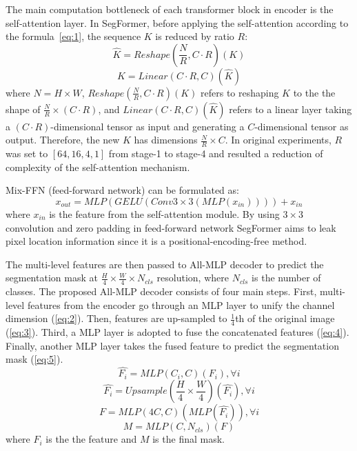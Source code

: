 The main computation bottleneck of each transformer block in encoder is the self-attention layer. In SegFormer, before applying the self-attention according to the formula~\ref{eq:1}, the sequence $K$ is reduced by ratio $R$:
$$\hat{K} = Reshape(\frac{N}{R}, C\cdot R)(K)$$
$$K = Linear(C \cdot R, C)(\hat{K})$$
where $N = H \times W$, $Reshape(\frac{N}{R}, C \cdot R)(K)$ refers to reshaping $K$ to the the shape of $\frac{N}{R} \times (C \cdot R)$, and $Linear(C \cdot R, C)(\hat{K})$ refers to a linear layer taking a $(C \cdot R)$-dimensional tensor as input and generating a $C$-dimensional tensor as output. Therefore, the new $K$ has dimensions $\frac{N}{R} \times C$. 
In original experiments, $R$ was set to $[64, 16, 4, 1]$ from stage-1 to stage-4 and
resulted a reduction of complexity of the self-attention mechanism.

Mix-FFN (feed-forward network) can be formulated as:
$$x_{out} = MLP(GELU(Conv 3\times 3(MLP(x_{in})))) + x_{in}$$
where $x_{in}$ is the feature from the self-attention module. By using $3 \times 3$ convolution and zero padding in feed-forward network SegFormer aims to leak pixel location information since it is a positional-encoding-free method.


The multi-level features are then passed to All-MLP decoder to predict the segmentation mask at $\frac{H}{4}\times \frac{W}{4}\times N_{cls}$ resolution, where $N_{cls}$ is the number of classes.
The proposed All-MLP decoder consists of four main steps. First, multi-level features from
the encoder go through an MLP layer to unify the channel dimension (\ref{eq:2}). Then, features are up-sampled to $\frac{1}{4}$th of the original image (\ref{eq:3}). Third, a MLP layer is adopted to fuse the concatenated features (\ref{eq:4}). Finally, another MLP layer takes the fused feature to predict the segmentation mask (\ref{eq:5}).
\begin{equation} \label{eq:2}
\hat{F_i} = MLP(C_i, C)(F_i), \forall i
\end{equation}
\begin{equation} \label{eq:3}
\hat{F_i} = Upsample(\frac{H}{4}\times \frac{W}{4})(\hat{F_i}), \forall i
\end{equation}
\begin{equation} \label{eq:4}
F = MLP(4C, C)(MLP(\hat{F_i})), \forall i
\end{equation}
\begin{equation} \label{eq:5}
M = MLP(C, N_{cls})(F)
\end{equation}
where $F_i$ is the the feature and $M$ is the final mask.

